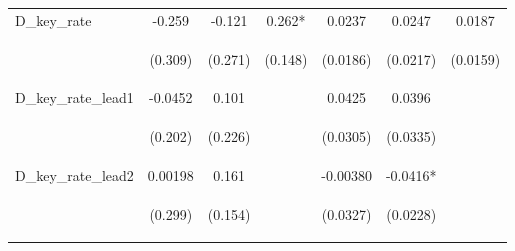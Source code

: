 \documentclass[]{article}
\begin{document}
\begin{center}
\begin{tabular}{lcccccc}
D\_key\_rate & -0.259 & -0.121 & 0.262* & 0.0237 & 0.0247 & 0.0187 \\
\vspace{4pt} & \begin{footnotesize}(0.309)\end{footnotesize} & \begin{footnotesize}(0.271)\end{footnotesize} & \begin{footnotesize}(0.148)\end{footnotesize} & \begin{footnotesize}(0.0186)\end{footnotesize} & \begin{footnotesize}(0.0217)\end{footnotesize} & \begin{footnotesize}(0.0159)\end{footnotesize} \\
D\_key\_rate\_lead1 & -0.0452 & 0.101 &  & 0.0425 & 0.0396 &  \\
\vspace{4pt} & \begin{footnotesize}(0.202)\end{footnotesize} & \begin{footnotesize}(0.226)\end{footnotesize} & \begin{footnotesize}\end{footnotesize} & \begin{footnotesize}(0.0305)\end{footnotesize} & \begin{footnotesize}(0.0335)\end{footnotesize} & \begin{footnotesize}\end{footnotesize} \\
D\_key\_rate\_lead2 & 0.00198 & 0.161 &  & -0.00380 & -0.0416* &  \\
\vspace{4pt} & \begin{footnotesize}(0.299)\end{footnotesize} & \begin{footnotesize}(0.154)\end{footnotesize} & \begin{footnotesize}\end{footnotesize} & \begin{footnotesize}(0.0327)\end{footnotesize} & \begin{footnotesize}(0.0228)\end{footnotesize} & \begin{footnotesize}\end{footnotesize} \\

\end{tabular}
\end{center}
\end{document}

